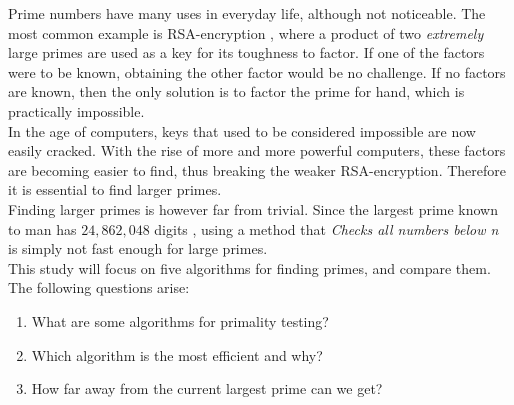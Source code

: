 \documentclass[main.tex]{subfiles}
\begin{document}
Prime numbers have many uses in everyday life, although not noticeable. The most
common example is RSA-encryption \cite{rsa}, where a product of two
\emph{extremely} large primes are used as a key for its toughness to factor. If
one of the factors were to be known, obtaining the other factor would be no
challenge. If no factors are known, then the only solution is to factor the
prime for hand, which is practically impossible. \\

In the age of computers, keys that used to be considered impossible are now
easily cracked. With the rise of more and more powerful computers, these factors
are becoming easier to find, thus breaking the weaker RSA-encryption. Therefore it is essential to find larger primes. \\

Finding larger primes is however far from trivial. Since the largest prime known
to man has $24,862,048$ digits \cite{prime:largest_digits}, using a method that
\emph{Checks all numbers below n} is simply not fast enough for large
primes. \\

This study will focus on five algorithms for finding primes, and compare them.
The following questions arise:

\begin{enumerate}
\item What are some algorithms for primality testing?
\item Which algorithm is the most efficient and why?
\item How far away from the current largest prime can we get?
\end{enumerate}
\end{document}
